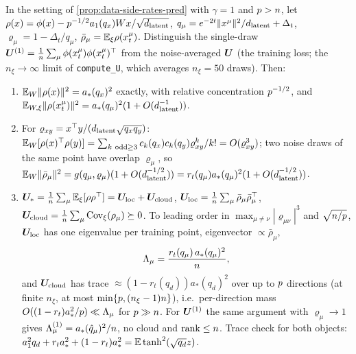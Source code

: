 \begin{proposition}[sketched]\label{prop:sample-bulk-persample-pred}
In the setting of \cref{prop:data-side-rates-pred} with $\gamma=1$ and $p>n$, let $\rho(x)=\phi(x)-p^{-1/2}a_1(q_x)Wx/\sqrt{d_{\mathrm{latent}}}$, $q_\mu=e^{-2t}\|x^\mu\|^2/d_{\mathrm{latent}}+\Delta_t$, $\varrho_\mu=1-\Delta_t/q_\mu$, $\bar\rho_\mu=\mathbb{E}_\xi\rho(x_t^\mu)$. Distinguish the single-draw $\bm{U}^{(1)}=\frac1{n}\sum_\mu\phi(x_t^\mu)\phi(x_t^\mu)^\top$ from the noise-averaged $\bm{U}$ (the training loss; the $n_\xi\to\infty$ limit of \texttt{compute\_U}, which averages $n_\xi=50$ draws). Then:
\begin{enumerate}
\item $\mathbb{E}_W\|\rho(x)\|^2=a_*(q_x)^2$ exactly, with relative concentration $p^{-1/2}$, and $\mathbb{E}_{W,\xi}\|\rho(x_t^\mu)\|^2=a_*(q_\mu)^2(1+O(d_{\mathrm{latent}}^{-1}))$.
\item For $\varrho_{xy}=x^\top y/(d_{\mathrm{latent}}\sqrt{q_xq_y})$: $\E_W[\rho(x)^\top\rho(y)]=\sum_{k\ \mathrm{odd}\ge3}c_k(q_x)c_k(q_y)\varrho_{xy}^k/k!=O(\varrho_{xy}^3)$; two noise draws of the same point have overlap $\varrho_\mu$, so $\mathbb{E}_W\|\bar\rho_\mu\|^2=g(q_\mu,\varrho_\mu)(1+O(d_{\mathrm{latent}}^{-1/2}))=r_t(q_\mu)a_*(q_\mu)^2(1+O(d_{\mathrm{latent}}^{-1/2}))$.
\item $\bm{U}_*=\frac1{n}\sum_\mu\mathbb{E}_\xi[\rho\rho^\top]=\bm{U}_{\rm loc}+\bm{U}_{\rm cloud}$, $\bm{U}_{\rm loc}=\frac1{n}\sum_\mu\bar\rho_\mu\bar\rho_\mu^\top$, $\bm{U}_{\rm cloud}=\frac1{n}\sum_\mu\mathrm{Cov}_\xi(\rho_\mu)\succeq0$. To leading order in $\max_{\mu\ne\nu}|\varrho_{\mu\nu}|^3$ and $\sqrt{n/p}$, $\bm{U}_{\rm loc}$ has one eigenvalue per training point, eigenvector $\propto\bar\rho_\mu$,
\begin{equation}\label{eq:Lambda-mu-pred}
 \Lambda_\mu=\frac{r_t(q_\mu)\,a_*(q_\mu)^2}{n},
\end{equation}
and $\bm{U}_{\rm cloud}$ has trace $\approx(1-r_t(q_d))a_*(q_d)^2$ over up to $p$ directions (at finite $n_\xi$, at most $\min\{p,(n_\xi-1)n\}$), i.e.\ per-direction mass $O((1-r_t)a_*^2/p)\ll\Lambda_\mu$ for $p\gg n$. For $\bm{U}^{(1)}$ the same argument with $\varrho_\mu\to1$ gives $\Lambda^{(1)}_\mu=a_*(\hat q_\mu)^2/n$, no cloud and $\mathrm{rank}\le n$. Trace check for both objects: $a_1^2q_d+r_ta_*^2+(1-r_t)a_*^2=\mathbb{E}\tanh^2(\sqrt{q_d}z)$.

\end{enumerate}
\end{proposition}
